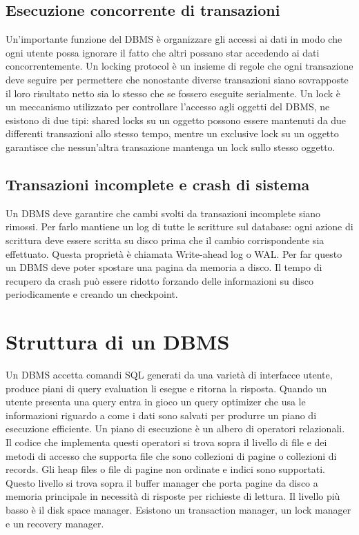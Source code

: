 \subsection{Esecuzione concorrente di transazioni}
Un'importante funzione del DBMS \`e organizzare gli accessi ai dati in modo che ogni utente possa ignorare il fatto che altri possano star accedendo ai dati concorrentemente. Un locking protocol \`e un insieme 
di regole che ogni transazione deve seguire per permettere che nonostante diverse transazioni siano sovrapposte il loro risultato netto sia lo stesso che se fossero eseguite serialmente. Un lock \`e un 
meccanismo utilizzato per controllare l'accesso agli oggetti del DBMS, ne esistono di due tipi: shared locks su un oggetto possono essere mantenuti da due differenti transazioni allo stesso tempo, mentre un 
exclusive lock su un oggetto garantisce che nessun'altra transazione mantenga un lock sullo stesso oggetto. 
\subsection{Transazioni incomplete e crash di sistema}
Un DBMS deve garantire che cambi svolti da transazioni incomplete siano rimossi. Per farlo mantiene un log di tutte le scritture sul database: ogni azione di scrittura deve essere scritta su disco prima che il 
cambio corrispondente sia effettuato. Questa propriet\`a \`e chiamata Write-ahead log o WAL. Per far questo un DBMS deve poter spostare una pagina da memoria a disco. Il tempo di recupero da crash pu\`o 
essere ridotto forzando delle informazioni su disco periodicamente e creando un checkpoint.
\section{Struttura di un DBMS}
Un DBMS accetta comandi SQL generati da una variet\`a di interfacce utente, produce piani di query evaluation li esegue e ritorna la risposta.  Quando un utente presenta una query entra in gioco un query 
optimizer che usa le informazioni riguardo a come i dati sono salvati per produrre un piano di esecuzione efficiente. Un piano di esecuzione \`e un albero di operatori relazionali. Il codice che implementa questi 
operatori si trova sopra il livello di file e  dei metodi di accesso che supporta file che sono collezioni di pagine o collezioni di records. Gli heap files o file di pagine non ordinate e indici sono supportati. Questo 
livello si trova sopra il buffer manager che porta pagine da disco a memoria principale in necessit\`a di risposte per richieste di lettura. Il livello pi\`u basso \`e il disk space manager. Esistono un transaction 
manager, un lock manager e un recovery manager. 